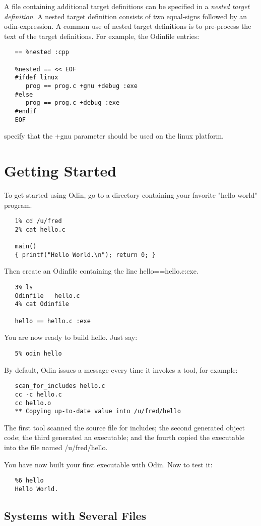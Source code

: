 A file containing additional target definitions can be specified in a
{\em nested target definition}.
A nested target definition consists of two equal-signs followed by an
odin-expression.
A common use of nested target definitions is to pre-process the text
of the target definitions.
For example, the {\ex Odinfile} entries:
\begin{verbatim}
   == %nested :cpp

   %nested == << EOF
   #ifdef linux
      prog == prog.c +gnu +debug :exe
   #else
      prog == prog.c +debug :exe
   #endif
   EOF
\end{verbatim}
specify that the {\ex +gnu} parameter should be used
on the {\ex linux} platform.


\chapter{Getting Started}


To get started using Odin,
go to a directory containing your favorite "hello world" program.
\begin{verbatim}
   1% cd /u/fred
   2% cat hello.c

   main()
   { printf("Hello World.\n"); return 0; }
\end{verbatim}
Then create an {\ex Odinfile} containing the line {\ex hello==hello.c:exe}.
\begin{verbatim}
   3% ls
   Odinfile   hello.c
   4% cat Odinfile

   hello == hello.c :exe
\end{verbatim}
You are now ready to build {\ex hello}.  Just say:
\begin{verbatim}
   5% odin hello
\end{verbatim}
By default, Odin issues a message every time it invokes a tool, for example:
\begin{verbatim}
   scan_for_includes hello.c
   cc -c hello.c
   cc hello.o
   ** Copying up-to-date value into /u/fred/hello
\end{verbatim}
The first tool scanned the source file for includes; the second generated
object code; the third generated an executable; and the fourth copied the
executable into the file named {\ex /u/fred/hello}.

You have now built your first executable with Odin.  Now to test it:
\begin{verbatim}
   %6 hello
   Hello World.
\end{verbatim}


\section{Systems with Several Files}

